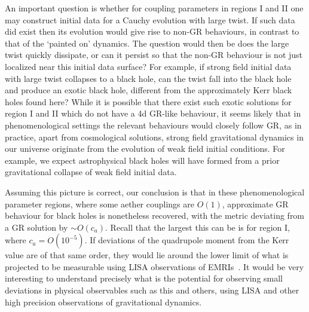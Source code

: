 \documentclass[12pt]{article}
\numberwithin{equation}{section}
\begin{document}
An important question is whether 
for coupling parameters
in regions I and II one may construct initial data for a Cauchy evolution with large twist. If such data did exist then its evolution would give rise to  non-GR behaviours, in contrast to that of the `painted on' dynamics. The question would then be does the large twist quickly dissipate, or can it persist so that the non-GR behaviour is not just localized near this initial data surface?
For example, if strong field initial data with large twist collapses to a black hole, can the
twist fall into the black hole and produce 
an exotic black hole, different from the approximately Kerr black holes found here? 
While it is possible that there exist such exotic solutions for region I and II which do not have a 4d GR-like behaviour, it seems likely that in phenomenological settings the relevant behaviours would closely follow GR, as in practice, apart from cosmological solutions, strong field gravitational dynamics in our universe originate from the evolution of weak field initial conditions. 
For example, we expect astrophysical black holes will have formed from a prior gravitational collapse of weak field initial data. 


Assuming this picture is correct, our conclusion is that in these phenomenological parameter regions, where some aether couplings are $O(1)$, approximate  GR behaviour for black holes 
is nonetheless recovered, with the metric deviating from a GR solution by $\sim O(c_a)$. Recall that the largest this can be is for region I, where $c_a = O(10^{-5})$. If deviations of the quadrupole moment from the Kerr value are of that same order, they would lie around the lower limit of what is projected to be measurable using LISA observations of EMRIs~\cite{Babak:2017tow}. It would be very interesting to understand precisely what is the potential for observing small deviations in physical observables such as this and others, using LISA and other high precision observations of gravitational dynamics.
\end{document}
